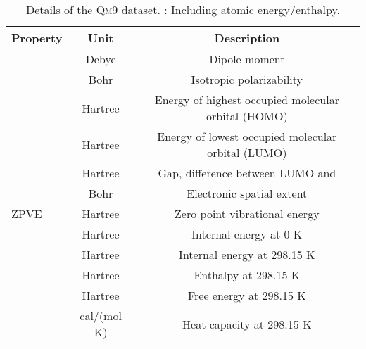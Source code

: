 \documentclass[letterpaper]{article}
\theoremstyle{definition}
\begin{document}
\begin{table*}
	\caption{Details of the  \textsc{Qm9} dataset. : Including atomic energy/enthalpy.
	}\label{fig:qm9_details}
	\renewcommand{\arraystretch}{1.0}
	\centering
	\begin{tabular}{lcc}
		\toprule
		\textbf{Property} & \textbf{Unit} & \textbf{Description} \\
		\midrule
		                       & Debye   &     Dipole moment  \\
		                    &  Bohr   &    Isotropic polarizability \\
		 & Hartree &     Energy of highest occupied molecular
		orbital (HOMO)  \\
		 &  Hartree  &    Energy of lowest occupied molecular
		orbital (LUMO)     \\
		         &  Hartree  &    Gap, difference between LUMO and \\
		       &Bohr  &    Electronic spatial extent                \\
		\textsc{ZPVE}               &Hartree  &    Zero point vibrational energy    \\
		                      &Hartree &     Internal energy at 0 K  \\
		                         &Hartree   &   Internal energy at 298.15 K  \\
		                         &Hartree     & Enthalpy at 298.15 K  \\
		                         &Hartree     & Free energy at 298.15 K
		 \\
		              & cal/(mol K)&  Heat capacity at 298.15 K   \\
		\bottomrule
	\end{tabular}
\end{table*}
\end{document}
